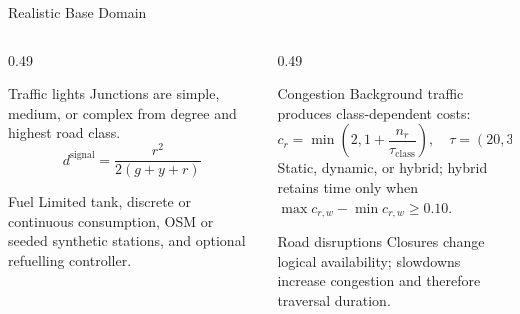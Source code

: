 \documentclass[10pt,aspectratio=169]{beamer}
\begin{document}
\begin{frame}{Realistic Base Domain}
  \begin{columns}[T,onlytextwidth]
    \begin{column}{0.49\textwidth}
      \begin{beamerboxesrounded}[upper=block title,lower=block body,shadow=true]{Traffic lights}
        \scriptsize Junctions are simple, medium, or complex from degree and highest road class.
        \[
          d^{\mathrm{signal}}=\frac{r^2}{2(g+y+r)}
        \]
      \end{beamerboxesrounded}

      \vspace{0.18cm}
      \begin{beamerboxesrounded}[upper=block title,lower=block body,shadow=true]{Fuel}
        \scriptsize Limited tank, discrete or continuous consumption, OSM or seeded synthetic stations, and optional refuelling controller.
      \end{beamerboxesrounded}
    \end{column}
    \begin{column}{0.49\textwidth}
      \begin{beamerboxesrounded}[upper=block title,lower=block body,shadow=true]{Congestion}
        \scriptsize Background traffic produces class-dependent costs:
        \[
          c_r=\min\!\left(2,1+\frac{n_r}{\tau_{\mathrm{class}}}\right),\quad
          \tau=(20,35,50).
        \]
        \scriptsize Static, dynamic, or hybrid; hybrid retains time only when $\max c_{r,w}-\min c_{r,w}\ge 0.10$.
      \end{beamerboxesrounded}

      \vspace{0.18cm}
      \begin{beamerboxesrounded}[upper=block title,lower=block body,shadow=true]{Road disruptions}
        \scriptsize Closures change logical availability; slowdowns increase congestion and therefore traversal duration.
      \end{beamerboxesrounded}
    \end{column}
  \end{columns}


\end{frame}
\end{document}
